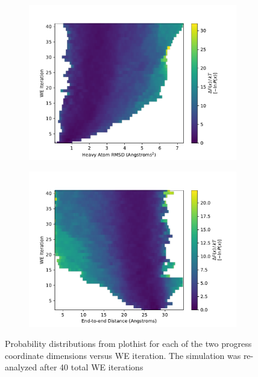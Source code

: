 \documentclass[9pt,tutorial]{livecoms}
\begin{document}
\begin{figure}
\centering
\begin{subfigure}[A]{0.22\textwidth}
\includegraphics[width=\linewidth]{Figure7A.pdf}
\end{subfigure}
\begin{subfigure}[B]{0.22\textwidth}
\includegraphics[width=\linewidth]{Figure7B.pdf}
\end{subfigure}
\caption{Probability distributions from plothist for each of the two progress coordinate dimensions versus WE iteration. 
The simulation was re-analyzed after 40 total WE iterations}
\label{fig:view}
\end{figure}
\end{document}

